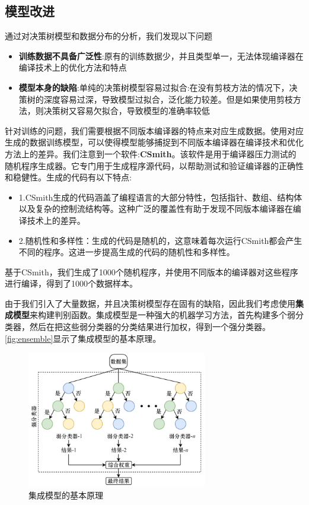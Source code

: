 \subsection{模型改进}
通过对决策树模型和数据分布的分析，我们发现以下问题
\begin{itemize}
	\item \textbf{训练数据不具备广泛性}:原有的训练数据少，并且类型单一，无法体现编译器在编译技术上的优化方法和特点
	\item \textbf{模型本身的缺陷}:单纯的决策树模型容易过拟合:在没有剪枝方法的情况下，决策树的深度容易过深，导致模型过拟合，泛化能力较差。但是如果使用剪枝方法，则决策树又容易欠拟合，导致模型的准确率较低
\end{itemize}
\par
针对训练的问题，我们需要根据不同版本编译器的特点来对应生成数据。使用对应生成的数据训练模型，可以使得模型能够捕捉到不同版本编译器在编译技术和优化方法上的差异。我们注意到一个软件:\textbf{CSmith}。该软件是用于编译器压力测试的随机程序生成器。它专门用于生成程序源代码，以帮助测试和验证编译器的正确性和稳健性。生成的代码有以下特点:
\begin{itemize}
	\item 1.CSmith生成的代码涵盖了编程语言的大部分特性，包括指针、数组、结构体以及复杂的控制流结构等。这种广泛的覆盖性有助于发现不同版本编译器在编译技术上的差异。
	\item 2.随机性和多样性：生成的代码是随机的，这意味着每次运行CSmith都会产生不同的程序。这进一步提高生成的代码的随机性和多样性。
\end{itemize}
基于CSmith，我们生成了1000个随机程序，并使用不同版本的编译器对这些程序进行编译，得到了1000个数据样本。
\par
由于我们引入了大量数据，并且决策树模型存在固有的缺陷，因此我们考虑使用\textbf{集成模型}来构建判别函数。集成模型是一种强大的机器学习方法，首先构建多个弱分类器，然后在把这些弱分类器的分类结果进行加权，得到一个强分类器。\autoref{fig:ensemble}显示了集成模型的基本原理。
\begin{figure}
	\centering
	\includegraphics[width=0.7\textwidth]{figures/ensemble.png}
	\caption{集成模型的基本原理}
	\label{fig:ensemble}
\end{figure}
